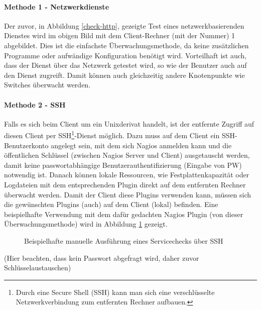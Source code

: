 \paragraph{Methode 1 - Netzwerkdienste}
Der zuvor, in Abbildung \ref{check-http}, gezeigte Test eines netzwerkbasierenden Dienstes wird im obigen Bild mit dem Client-Rechner (mit der Nummer) 1 abgebildet.
Dies ist die einfachste Überwachungsmethode, da keine zusätzlichen Programme oder aufwändige Konfiguration benötigt wird.
Vorteilhaft ist auch, dass der Dienst über das Netzwerk getestet wird, so wie der Benutzer auch auf den Dienst zugreift.
Damit können auch gleichzeitig andere Knotenpunkte wie Switches überwacht werden.

\paragraph{Methode 2 - SSH}

Falls es sich beim Client um ein Unixderivat handelt, ist der entfernte Zugriff auf diesen Client per SSH\footnote{Durch eine Secure Shell (\gls{SSH}) kann man sich eine verschlüsselte Netzwerkverbindung zum entfernten Rechner aufbauen.}-Dienst möglich.
Dazu muss auf dem Client ein \gls{SSH}-Benutzerkonto angelegt sein, mit dem sich Nagios anmelden kann und die öffentlichen Schlüssel (zwischen Nagios Server und Client) ausgetauscht werden, damit keine passwortabhängige Benutzerauthentifizierung (Eingabe von PW) notwendig ist.
Danach können lokale Ressourcen, wie Festplattenkapazität oder Logdateien mit dem entsprechenden Plugin direkt auf dem entfernten Rechner überwacht werden.
Damit der Client diese Plugins verwenden kann, müssen sich die gewünschten Plugins (auch) auf dem Client (lokal) befinden.
Eine beispielhafte Verwendung mit dem dafür gedachten Nagios Plugin  (von dieser Überwachungsmethode) wird in Abbildung \ref{check-ssh} gezeigt.

\begin{figure}[ht]
	\centering
		\caption{Beispielhafte manuelle Ausführung eines Servicechecks über SSH}
		\label{check-ssh}
\end{figure}

(Hier beachten, dass kein Passwort abgefragt wird, daher zuvor Schlüsselaustauschen)

